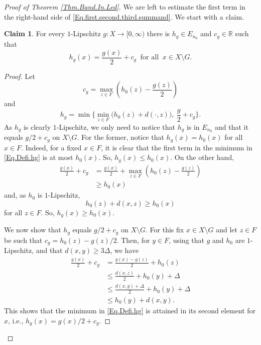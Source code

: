 \documentclass[11pt]{amsart}
\newcommand{\R}{\mathbb{R}}
\numberwithin{equation}{section}
\theoremstyle{definition}
\newtheorem{claim}[theorem]{Claim}
\theoremstyle{remark}
\begin{document}
\begin{proof}[Proof of Theorem \ref{Thm.Band.In.Led}]
We are left to estimate the first term in the right-hand side of \eqref{Eq.first.second.third.summand}. We start with a claim.


\begin{claim}\label{Claim.g.hg.cg}
   For every $1$-Lipschitz $g\colon X\to[0,\infty)$ there is $h_g\in E_{n_0}$ and $c_g\in\R$ such that
\begin{equation}\label{Eq.Gluing}
h_g(x)=\frac{g(x)}{2}+c_g\ \text{ for all }\ x\in X\setminus G .
\end{equation}
\end{claim}

\begin{proof}
Let \[c_g=\max_{z\in F}\left(h_0(z)-\frac{g(z)}{2}\right)\] and
\begin{equation}\label{Eq.Defi.hg}h_g=\min\Big\{\min_{z\in F}\big(h_0(z)+d(\cdot,z)\big),\ \frac{g}{2}+c_g\Big\}.\end{equation}
As $h_g$ is clearly $1$-Lipschitz, we only need to notice that $h_g$ is in $E_{n_0}$ and that it equals $g/2+c_g$ on $X\setminus G$. For the former, notice that  $h_g(x)=h_0(x)$ for all $x\in F$. Indeed, for a fixed $x\in F$, it is clear that the first term in the minimum in \eqref{Eq.Defi.hg} is at most $h_0(x)$. So, $h_g(x)\leq h_0(x)$.  On the other hand,
\begin{align*}\frac{g(x)}{2}+c_g&= \frac{g(x)}{2}+ \max_{z\in F}\left(h_0(z)-\frac{g(z)}{2}\right)\\
&\geq h_0(x)\end{align*}
and, as $h_0$ is $1$-Lipschitz, 
\[h_0(z)+d(x,z)\geq h_0(x)\]
for all $z\in F$.  So, $h_g(x)\geq h_0(x)$.

We now show that  $h_g$  equals $g/2+c_g$ on $X\setminus G$.
 For this fix  $x\in X\setminus G$  and let $z\in F$ be such that  $c_g=h_0(z)-g(z)/2$. Then, for  $y\in F$, using that $g$ and $h_0$ are $1$-Lipschitz, and that $d(x,y)\geq3\Delta$, we have
\begin{align*}
\frac{g(x)}{2}+c_g&=\frac{g(x)-g(z)}{2}+h_0(z)\\
&\leq \frac{d(x,z)}{2}+h_0(y)+\Delta\\
&\leq \frac{d(x,y)+\Delta}{2}+h_0(y)+\Delta\\
&\leq h_0(y)+d(x,y).
\end{align*}
This shows that the minimum in \eqref{Eq.Defi.hg} is  attained in its second element for $x$, i.e., $h_g(x)=g(x)/2+c_g$.
\end{proof}





\end{proof}
\end{document}
